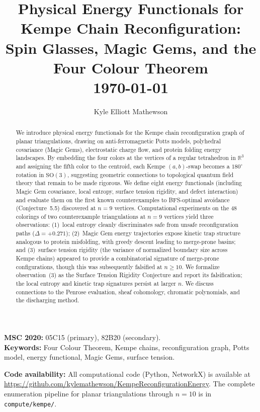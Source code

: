 
\title{\textbf{Physical Energy Functionals for Kempe Chain Reconfiguration:\\
Spin Glasses, Magic Gems, and the Four Colour Theorem}\\[1em]
\large \today}

\author{Kyle Elliott Mathewson}

\date{}

\maketitle

\begin{abstract}
We introduce physical energy functionals for the Kempe chain
reconfiguration graph of planar triangulations, drawing on
anti-ferromagnetic Potts models, polyhedral covariance (Magic Gems),
electrostatic charge flow, and protein folding energy landscapes. By
embedding the four colors at the vertices of a regular tetrahedron in
$\mathbb{R}^3$ and assigning the fifth color to the centroid, each Kempe
$(a,b)$-swap becomes a $180^\circ$ rotation in $\mathrm{SO}(3)$,
suggesting geometric connections to topological quantum field theory
that remain to be made rigorous. We define eight energy functionals (including Magic Gem
covariance, local entropy, surface tension rigidity, and defect
interaction) and evaluate them on the first known counterexamples to
BFS-optimal avoidance (Conjecture~5.5) discovered at $n = 9$ vertices.
Computational experiments on the 48 colorings of two counterexample
triangulations at $n = 9$ vertices yield three observations:
(1)~local entropy cleanly discriminates safe from unsafe reconfiguration
paths ($\Delta = +0.271$); (2)~Magic Gem energy trajectories expose
kinetic trap structure analogous to protein misfolding, with greedy
descent leading to merge-prone basins; and (3)~surface tension rigidity
(the variance of normalized boundary size across Kempe chains) appeared
to provide a combinatorial signature of merge-prone configurations,
though this was subsequently falsified at $n \geq 10$.
We formalize observation~(3) as the Surface Tension Rigidity Conjecture
and report its falsification; the local entropy and kinetic trap
signatures persist at larger $n$. We discuss connections to the Penrose evaluation,
sheaf cohomology, chromatic polynomials, and the discharging method.
\end{abstract}

\vspace{1em}
\noindent\textbf{MSC 2020:} 05C15 (primary), 82B20 (secondary).\\
\noindent\textbf{Keywords:} Four Colour Theorem, Kempe chains, reconfiguration graph, Potts model, energy functional, Magic Gems, surface tension.

\vspace{0.5em}
\noindent\textbf{Code availability:} All computational code (Python, NetworkX) is available at \url{https://github.com/kylemathewson/KempeReconfigurationEnergy}. The complete enumeration pipeline for planar triangulations through $n = 10$ is in \texttt{compute/kempe/}.

\thispagestyle{empty}
\newpage
